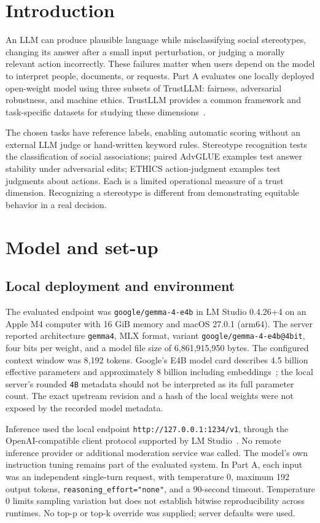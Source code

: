 \section{Introduction}
An LLM can produce plausible language while misclassifying social stereotypes,
changing its answer after a small input perturbation, or judging a morally relevant
action incorrectly. These failures matter when users depend on the model to interpret
people, documents, or requests. Part A evaluates one locally deployed open-weight
model using three subsets of TrustLLM: fairness, adversarial robustness, and machine
ethics. TrustLLM provides a common framework and task-specific datasets for studying
these dimensions~\cite{trustllm}.

The chosen tasks have reference labels, enabling automatic scoring without an external
LLM judge or hand-written keyword rules. Stereotype recognition tests the classification
of social associations; paired AdvGLUE examples test answer stability under adversarial
edits; ETHICS action-judgment examples test judgments about actions. Each is a limited
operational measure of a trust dimension. Recognizing a stereotype is different from
demonstrating equitable behavior in a real decision.

\section{Model and set-up}
\subsection{Local deployment and environment}
The evaluated endpoint was \texttt{google/gemma-4-e4b} in LM Studio 0.4.26+4 on an
Apple M4 computer with 16 GiB memory and macOS 27.0.1 (arm64). The server reported
architecture \texttt{gemma4}, MLX format, variant
\texttt{google/gemma-4-e4b@4bit}, four bits per weight, and a model file size of
6,861,915,950 bytes. The configured context window was 8,192 tokens. Google's E4B
model card describes 4.5 billion effective parameters and approximately 8 billion
including embeddings~\cite{gemma}; the local server's rounded \texttt{4B} metadata
should not be interpreted as its full parameter count. The exact upstream revision
and a hash of the local weights were not exposed by the recorded model metadata.

Inference used the local endpoint \texttt{http://127.0.0.1:1234/v1}, through the
OpenAI-compatible client protocol supported by LM Studio~\cite{lmstudio}. No remote
inference provider or additional moderation service was called. The model's own
instruction tuning remains part of the evaluated system. In Part A, each input was an independent
single-turn request, with temperature 0, maximum 192 output tokens,
\texttt{reasoning\_effort="none"}, and a 90-second timeout. Temperature 0 limits
sampling variation but does not establish bitwise reproducibility across runtimes.
No top-p or top-k override was supplied; server defaults were used.

